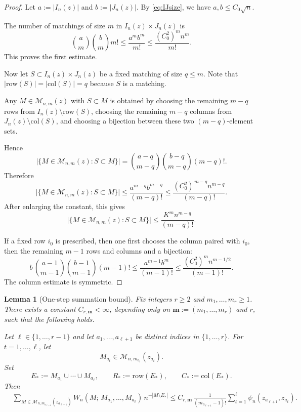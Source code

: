 \documentclass[11pt]{article}
\newtheorem{lemma}[thm]{Lemma}
\newcommand{\cM}{\mathcal{M}}
\newcommand{\abs}[1]{| #1|}
\begin{document}
\begin{proof}
Let $a:=|I_n(z)|$ and $b:=|J_n(z)|$. By \eqref{eq:IJsize}, we have
$a,b\le C_0\sqrt n$.

The number of matchings of size $m$ in $I_n(z)\times J_n(z)$ is
\[
\binom{a}{m}\binom{b}{m}m!
\le \frac{a^m b^m}{m!}
\le \frac{(C_0^2)^m n^m}{m!}.
\]
This proves the first estimate.


Now let $S\subset I_n(z)\times J_n(z)$ be a fixed matching of size $q\le m$. Note that $|\mathrm{row}(S)|=|\mathrm{col}(S)|=q$ because $S$ is a matching.

Any $M\in\cM_{n,m}(z)$ with $S\subset M$ is obtained by choosing the remaining $m-q$ rows from $I_n(z)\setminus \mathrm{row}(S)$, choosing the remaining $m-q$ columns from $J_n(z)\setminus \mathrm{col}(S)$, and choosing a bijection between these two $(m-q)$-element sets.

Hence
\[
\bigl|\{M\in\cM_{n,m}(z): S\subset M\}\bigr|
=
\binom{a-q}{m-q}\binom{b-q}{m-q}(m-q)!.
\]
Therefore
\[
\bigl|\{M\in\cM_{n,m}(z): S\subset M\}\bigr|
\le
\frac{a^{m-q}b^{m-q}}{(m-q)!}
\le
\frac{(C_0^2)^{\,m-q} n^{m-q}}{(m-q)!}.
\]
After enlarging the constant, this gives
\[
\bigl|\{M\in\cM_{n,m}(z): S\subset M\}\bigr|
\le \frac{K^m n^{m-q}}{(m-q)!}.
\]


If a fixed row $i_0$ is prescribed, then one first chooses the column paired with
$i_0$, then the remaining $m-1$ rows and columns and a bijection:
\[
b\,\binom{a-1}{m-1}\binom{b-1}{m-1}(m-1)!
\le \frac{a^{m-1}b^m}{(m-1)!}
\le \frac{(C_0^2)^m n^{m-1/2}}{(m-1)!}.
\]
The column estimate is symmetric.
\end{proof}

\begin{lemma}[One-step summation bound]\label{lem:onestep}
Fix integers $r\ge2$ and $m_1,\dots,m_r\ge1$.
There exists a constant $C_{r,\mathbf m}<\infty$, depending only on
$\mathbf m:=(m_1,\dots,m_r)$ and $r$, such that the following holds.

Let $\ell\in\{1,\dots,r-1\}$ and let $a_1,\dots,a_{\ell+1}$ be distinct indices in
$\{1,\dots,r\}$. For $t=1,\dots,\ell$, let
\[
M_{a_t}\in \cM_{n,m_{a_t}}(z_{a_t}).
\]
Set
\[
E_*:=M_{a_1}\cup\cdots\cup M_{a_\ell},
\qquad
R_*:=\mathrm{row}(E_*),
\qquad
C_*:=\mathrm{col}(E_*).
\]
Then
\begin{align}
&\sum_{M\in \cM_{n,m_{a_{\ell+1}}}(z_{a_{\ell+1}})}
W_n(M;\,M_{a_1},\dots,M_{a_\ell})\,n^{-\abs{M\setminus E_*}} \le
C_{r,\mathbf m}\,\frac{1}{(m_{a_{\ell+1}}-1)!}
\sum_{t=1}^{\ell}\psi_n(z_{a_{\ell+1}},z_{a_t}).
\label{eq:onestep}
\end{align}
\end{lemma}
\end{document}
